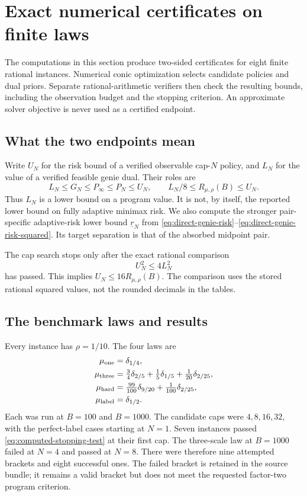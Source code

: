 \section{Exact numerical certificates on finite laws}
\label{sec:computation}

The computations in this section produce two-sided certificates for
eight finite rational instances. Numerical conic optimization selects
candidate policies and dual priors. Separate rational-arithmetic
verifiers then check the resulting bounds, including the observation
budget and the stopping criterion. An approximate solver objective is
never used as a certified endpoint.

\subsection{What the two endpoints mean}

Write $U_N$ for the risk bound of a verified observable cap-$N$ policy,
and $L_N$ for the value of a verified feasible genie dual. Their roles are
\[
 L_N\le G_N\le P_\infty\le P_N\le U_N,
 \qquad L_N/8\le R_{\mu,\rho}(B)\le U_N.
\]
Thus $L_N$ is a lower bound on a program value. It is not, by itself,
the reported lower bound on fully adaptive minimax risk. We also compute
the stronger pair-specific adaptive-risk lower bound
$\underline r_N$ from
\eqref{eq:direct-genie-risk}--\eqref{eq:direct-genie-risk-squared}.
Its target separation is that of the absorbed midpoint pair.

The cap search stops only after the exact rational comparison
\begin{equation}\label{eq:computed-stopping-test}
 U_N^2\le4L_N^2
\end{equation}
has passed. This implies $U_N\le16R_{\mu,\rho}(B)$.
The comparison uses the stored rational squared values, not the rounded
decimals in the tables.

\subsection{The benchmark laws and results}

Every instance has $\rho=1/10$. The four laws are
\begin{align*}
 \mu_{\rm one}&=\delta_{1/4},\\
 \mu_{\rm three}&=\tfrac34\delta_{2/5}
                  +\tfrac15\delta_{1/5}+\tfrac1{20}\delta_{2/25},\\
 \mu_{\rm hard}&=\tfrac{99}{100}\delta_{9/20}
                  +\tfrac1{100}\delta_{2/25},\\
 \mu_{\rm label}&=\delta_{1/2}.
\end{align*}
Each was run at $B=100$ and $B=1000$. The candidate caps were
$4,8,16,32$, with the perfect-label cases starting at $N=1$.
Seven instances passed \eqref{eq:computed-stopping-test} at their first
cap. The three-scale law at $B=1000$ failed at $N=4$ and passed at $N=8$.
There were therefore nine attempted brackets and eight successful ones.
The failed bracket is retained in the source bundle; it remains a valid
bracket but does not meet the requested factor-two program criterion.

